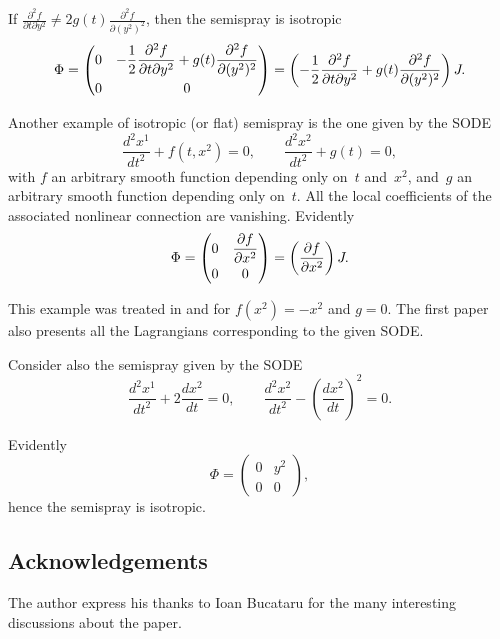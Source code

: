 \documentclass[pdftex]{sigma}
\begin{document}
If $\frac{\partial^{2}f}{\partial t\partial y^{2}}\neq2g(t)\frac{\partial^{2}f}{\partial(y^{2})^{2}}$,
then the semispray is isotropic  \[
\Phi= \begin{pmatrix}
0 & -\dfrac{1}{2}\dfrac{\partial^{2}f}{\partial t\partial y^{2}}+g(t)\dfrac{\partial^{2}f}{\partial(y^{2})^{2}}\vspace{1mm}\\
0 & 0\end{pmatrix} =\left(-\frac{1}{2}\frac{\partial^{2}f}{\partial t\partial y^{2}}+g(t)\frac{\partial^{2}f}{\partial(y^{2})^{2}}\right)J.\]


Another example of isotropic (or f\/lat) semispray is the one given
by the SODE
\[
\frac{d^{2}x^{1}}{dt^{2}}+f\left(t,x^{2}\right)   =0,\qquad
\frac{d^{2}x^{2}}{dt^{2}}+g(t)   =0, \]
 with $f$ an arbitrary smooth function depending only on~$t$ and~$x^{2}$,  and~$g$ an arbitrary smooth function depending only on~$t$. All the local coef\/f\/icients of the associated nonlinear connection
are vanishing. Evidently \[
\Phi= \begin{pmatrix}
0 & \dfrac{\partial f}{\partial x^{2}}\vspace{1mm}\\
0 & 0\end{pmatrix} =\left(\frac{\partial f}{\partial x^{2}}\right)J.\]


This example was treated in \cite[(6.1)]{anderso92} and \cite[(15.4)]{douglas41}
for $f(x^{2})=-x^{2}$ and $g=0$. The f\/irst paper also presents all
the Lagrangians corresponding to the given SODE.

Consider also the semispray given by the SODE \[
\frac{d^{2}x^{1}}{dt^{2}}+2\frac{dx^{2}}{dt}   =0,\qquad
\frac{d^{2}x^{2}}{dt^{2}}-\left(\frac{dx^{2}}{dt}\right)^{2}   =0. \]


Evidently \[
\Phi= \begin{pmatrix}
0 & y^{2}\\
0 & 0\end{pmatrix},\]
hence the semispray is isotropic.




\subsection*{Acknowledgements}
The author express his thanks to Ioan Bucataru for the many interesting
discussions about the paper.
\end{document}
